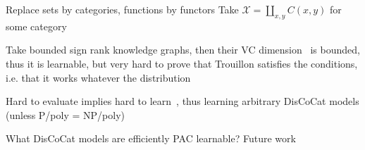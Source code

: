 Replace sets by categories, functions by functors
Take $\mathcal{X} = \coprod_{x, y} C(x, y)$ for some category

Take bounded sign rank knowledge graphs, then their VC dimension~\cite{VapnikChervonenkis15a} is bounded, thus it is learnable, but very hard to prove that Trouillon satisfies the conditions, i.e. that it works whatever the distribution

Hard to evaluate implies hard to learn~\cite[Theorem~7]{Schapire90}, thus learning arbitrary DisCoCat models (unless P/poly = NP/poly)

What DisCoCat models are efficiently PAC learnable? Future work
